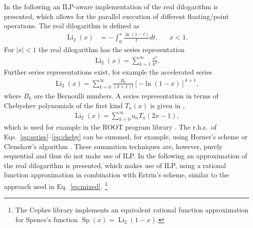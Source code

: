 \documentclass[10pt,DIV16,twocolumn,numbers=noenddot]{scrartcl}
\newcommand{\Li}{\operatorname{Li}_2}
\begin{document}
In the following an ILP-aware implementation of the real dilogarithm
is presented, which allows for the parallel execution of different
floating\-/point operations.  The real dilogarithm is defined as
%
\begin{align}
  \Li(x) &= -\int_0^x \frac{\ln(1-t)}{t}dt, &
  &x<1.
\end{align}
%
For $|x|<1$ the real dilogarithm has the series representation
%
\begin{align}
  \Li(x) = \sum_{k=1}^\infty \frac{x^k}{k^2}.
  \label{eq:series}
\end{align}
%
Further series representations exist, for example the accelerated
series
%
\begin{align}
  \Li(x) = \sum_{k=0}^\infty \frac{B_k}{(k+1)!} [-\ln(1-x)]^{k+1},
\end{align}
%
where $B_k$ are the Bernoulli numbers.  A series representation in
terms of Chebyshev polynomials of the first kind $T_n(x)$ is given in
\cite{luke},
%
\begin{align}
  \Li(x) = \sum_{k=0}^\infty a_n T_n(2x-1),
  \label{eq:cheby}
\end{align}
%
which is used for example in the ROOT program library \cite{root}.
The r.h.s.\ of Eqs.~\eqref{eq:series}--\eqref{eq:cheby} can be summed,
for example, using Horner's scheme or Clenshaw's algorithm
\cite{clenshaw}.  These summation techniques are, however, purely
sequential and thus do not make use of ILP.  In the following an
approximation of the real dilogarithm is presented, which makes use of
ILP, using a rational function approximation in combination with
Estrin's scheme, similar to the approach used in
Eq.~\eqref{eq:mixed}.%
\footnote{The Cephes library \cite{cephes} implements an equivalent
  rational function approximation for Spence's function
  $\operatorname{Sp}(x)=\Li(1-x)$.}
\end{document}
